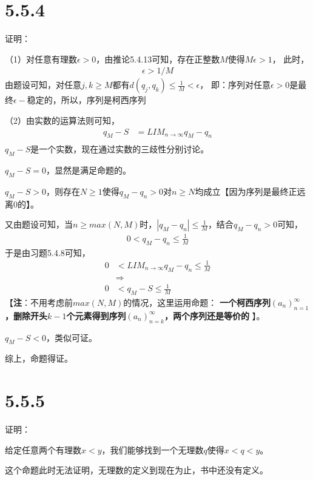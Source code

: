 \documentclass{article}
\theoremstyle{mystyle}
\begin{document}
\section*{5.5.4}

证明：

（1）对任意有理数$\epsilon > 0$，由推论5.4.13可知，存在正整数$M$使得$M\epsilon > 1$，
此时，
\begin{align*}
  \epsilon > 1/M
\end{align*}
由题设可知，对任意$j,k \geq M$都有$d(q_j,q_k) \leq \frac{1}{M} < \epsilon$，
即：序列对任意$\epsilon > 0$是最终$\epsilon -$稳定的，所以，序列是柯西序列

（2）由实数的运算法则可知，
\begin{align*}
  q_M - S & = LIM_{n\rightarrow \infty}q_M - q_n \\
\end{align*}
$q_M - S$是一个实数，现在通过实数的三歧性分别讨论。

$q_M - S = 0$，显然是满足命题的。

$q_M - S > 0$，则存在$N \geq 1$使得$q_M - q_n > 0$对$n \geq N$均成立【因为序列是最终正远离0的】。

又由题设可知，当$n \geq max(N, M)$时，$|q_M - q_n| \leq \frac{1}{M}$，结合$q_M - q_n > 0$可知，
\begin{align*}
  0 < q_M - q_n \leq \frac{1}{M}
\end{align*}
于是由习题5.4.8可知，
\begin{align*}
  0 & < LIM_{n\rightarrow \infty}q_M - q_n  \leq \frac{1}{M} \\
    & \Rightarrow                                            \\
  0 & < q_M - S                             \leq \frac{1}{M}
\end{align*}
【\textbf{注}：不用考虑前$max(N,M)$的情况，这里运用命题：
\textbf{一个柯西序列$(a_n)_{n=1}^\infty$，删除开头$k-1$个元素得到序列$(a_n)_{n=k}^\infty$，两个序列还是等价的} 】。

$q_M - S < 0$，类似可证。

综上，命题得证。

\section*{5.5.5}

证明：

给定任意两个有理数$x < y$，我们能够找到一个无理数$q$使得$x < q < y$。

这个命题此时无法证明，无理数的定义到现在为止，书中还没有定义。
\end{document}

